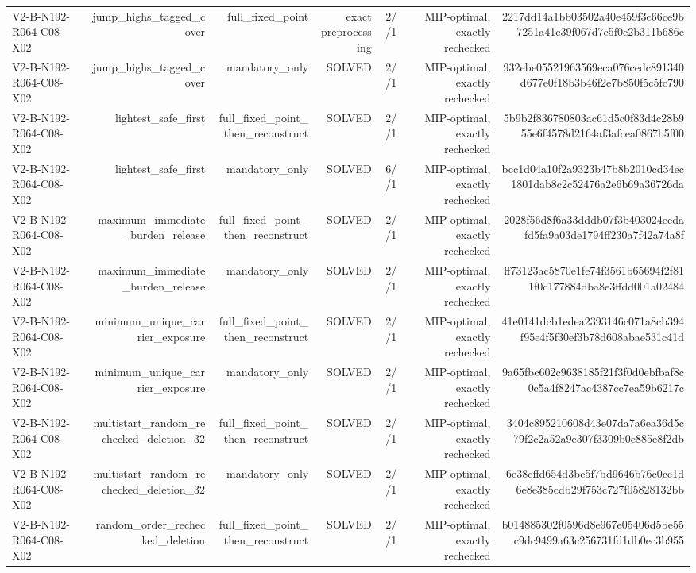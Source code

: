 {\begin{longtable}{lrrrrrr}
V2-B-N192-R064-C08-X02 & jump\_highs\_tagged\_cover & full\_fixed\_point & exact preprocessing & 2//1 & MIP-optimal, exactly rechecked & 2217dd14a1bb03502a40e459f3c66ce9b7251a41c39f067d7c5f0c2b311b686c \\
V2-B-N192-R064-C08-X02 & jump\_highs\_tagged\_cover & mandatory\_only & SOLVED & 2//1 & MIP-optimal, exactly rechecked & 932ebe05521963569eca076cedc891340d677e0f18b3b46f2e7b850f5c5fc790 \\
V2-B-N192-R064-C08-X02 & lightest\_safe\_first & full\_fixed\_point\_then\_reconstruct & SOLVED & 2//1 & MIP-optimal, exactly rechecked & 5b9b2f836780803ac61d5c0f83d4c28b955e6f4578d2164af3afcea0867b5f00 \\
V2-B-N192-R064-C08-X02 & lightest\_safe\_first & mandatory\_only & SOLVED & 6//1 & MIP-optimal, exactly rechecked & bcc1d04a10f2a9323b47b8b2010cd34ec1801dab8c2c52476a2e6b69a36726da \\
V2-B-N192-R064-C08-X02 & maximum\_immediate\_burden\_release & full\_fixed\_point\_then\_reconstruct & SOLVED & 2//1 & MIP-optimal, exactly rechecked & 2028f56d8f6a33dddb07f3b403024ecdafd5fa9a03de1794ff230a7f42a74a8f \\
V2-B-N192-R064-C08-X02 & maximum\_immediate\_burden\_release & mandatory\_only & SOLVED & 2//1 & MIP-optimal, exactly rechecked & ff73123ac5870e1fe74f3561b65694f2f811f0c177884dba8e3ffdd001a02484 \\
V2-B-N192-R064-C08-X02 & minimum\_unique\_carrier\_exposure & full\_fixed\_point\_then\_reconstruct & SOLVED & 2//1 & MIP-optimal, exactly rechecked & 41e0141dcb1edea2393146c071a8cb394f95e4f5f30ef3b78d608abae531c41d \\
V2-B-N192-R064-C08-X02 & minimum\_unique\_carrier\_exposure & mandatory\_only & SOLVED & 2//1 & MIP-optimal, exactly rechecked & 9a65fbc602c9638185f21f3f0d0ebfbaf8c0c5a4f8247ac4387cc7ea59b6217c \\
V2-B-N192-R064-C08-X02 & multistart\_random\_rechecked\_deletion\_32 & full\_fixed\_point\_then\_reconstruct & SOLVED & 2//1 & MIP-optimal, exactly rechecked & 3404c895210608d43e07da7a6ea36d5c79f2c2a52a9e307f3309b0e885e8f2db \\
V2-B-N192-R064-C08-X02 & multistart\_random\_rechecked\_deletion\_32 & mandatory\_only & SOLVED & 2//1 & MIP-optimal, exactly rechecked & 6e38cffd654d3be5f7bd9646b76c0ce1d6e8e385cdb29f753c727f05828132bb \\
V2-B-N192-R064-C08-X02 & random\_order\_rechecked\_deletion & full\_fixed\_point\_then\_reconstruct & SOLVED & 2//1 & MIP-optimal, exactly rechecked & b014885302f0596d8e967e05406d5be55c9dc9499a63c256731fd1db0ec3b955 \\

\end{longtable}}
